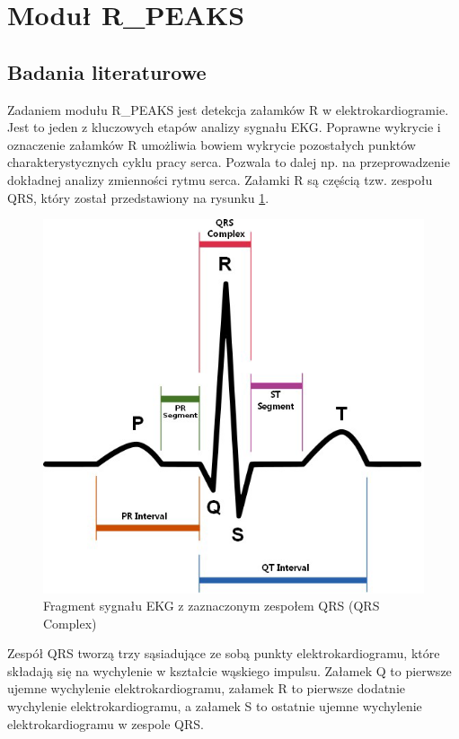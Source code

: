 \setcounter{secnumdepth}{3}
\section{Moduł R\_PEAKS}
\subsection{Badania literaturowe}

Zadaniem modułu R\_PEAKS jest detekcja załamków R w elektrokardiogramie. Jest to jeden z kluczowych etapów analizy sygnału EKG. Poprawne wykrycie i oznaczenie załamków R umożliwia bowiem wykrycie pozostałych punktów charakterystycznych cyklu pracy serca. Pozwala to dalej np. na przeprowadzenie dokładnej analizy zmienności rytmu serca. Załamki R są częścią tzw. zespołu QRS, który został przedstawiony na rysunku \ref{fig:RPQRS}.
\begin{figure}[H]
\centering
\includegraphics[scale=0.7]{R_PEAKS/img/qrs_class}
\caption{Fragment sygnału EKG z zaznaczonym zespołem QRS (QRS Complex)}
\label{fig:RPQRS}
\end{figure}
Zespół QRS tworzą trzy sąsiadujące ze sobą punkty elektrokardiogramu, które składają się na wychylenie w kształcie wąskiego impulsu. Załamek Q to pierwsze ujemne wychylenie elektrokardiogramu, załamek R to pierwsze dodatnie wychylenie elektrokardiogramu, a załamek S to ostatnie ujemne wychylenie elektrokardiogramu w zespole QRS.

